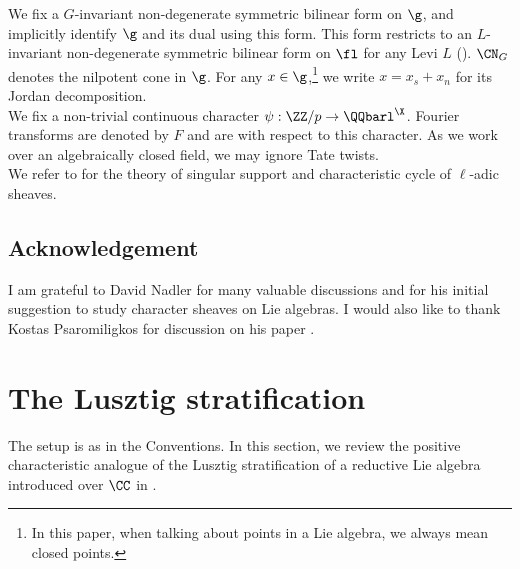      We fix a $G$-invariant non-degenerate symmetric bilinear form on $\g$, and implicitly identify $\g$ and its dual using this form. This form restricts to an $L$-invariant non-degenerate symmetric bilinear form on $\fl$ for any Levi $L$ (\cite[.14]{letellier_fourier_2005}). $\CN_G$ denotes the nilpotent cone in $\g$. For any $x\in\g$,\footnote{In this paper, when talking about points in a Lie algebra, we always mean closed points.} we write $x=x_s+x_n$ for its Jordan decomposition.\\ 

     We fix a non-trivial continuous character $\psi: \ZZ/p \rightarrow \QQbarl^\X$. Fourier transforms are denoted by $F$ and are with respect to this character. As we work over an algebraically closed field, we may ignore Tate twists.\\

     We refer to \cites{beilinson_constructible_2016, saito_characteristic_2017, umezaki_characteristic_2020, barrett_singular_2023} for the theory of singular support and characteristic cycle of $\ell$-adic sheaves.

\subsection*{Acknowledgement}
I am grateful to David Nadler for many valuable discussions and for his initial suggestion to study character sheaves on Lie algebras. I would also like to thank Kostas Psaromiligkos for discussion on his paper \cite{psaromiligkos_character_2023}.

\section{The Lusztig stratification}\label{sec_lusztigstrat}
The setup is as in the Conventions. In this section, we review the positive characteristic analogue of the Lusztig stratification of a reductive Lie algebra introduced over $\CC$ in \cite[\nopp §6]{lusztig_cuspidal_1995}.\\

